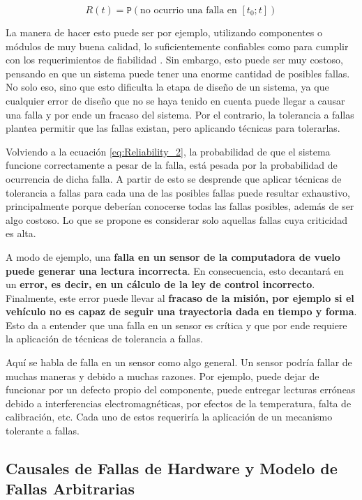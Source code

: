 \begin{equation}
    R(t) = \mathtt{P}\left( \text{no ocurrio una falla en $[t_0;t]$} \right)
    \label{eq:Reliability_3}
\end{equation}

La manera de hacer esto puede ser por ejemplo, utilizando componentes o módulos de muy buena calidad, lo suficientemente confiables como para cumplir con los requerimientos de fiabilidad \cite{nelson1990fault}. Sin embargo, esto puede ser muy costoso, pensando en que un sistema puede tener una enorme cantidad de posibles fallas. No solo eso, sino que esto dificulta la etapa de diseño de un sistema, ya que cualquier error de diseño que no se haya tenido en cuenta puede llegar a causar una falla y por ende un fracaso del sistema. Por el contrario, la tolerancia a fallas plantea permitir que las fallas existan, pero aplicando técnicas para tolerarlas.

Volviendo a la ecuación \eqref{eq:Reliability_2}, la probabilidad de que el sistema funcione correctamente a pesar de la falla, está pesada por la probabilidad de ocurrencia de dicha falla. A partir de esto se desprende que aplicar técnicas de tolerancia a fallas para cada una de las posibles fallas puede resultar exhaustivo, principalmente porque deberían conocerse todas las fallas posibles, además de ser algo costoso. Lo que se propone es considerar solo aquellas fallas cuya criticidad es alta.

A modo de ejemplo, una \textbf{falla en un sensor de la computadora de vuelo puede generar una lectura incorrecta}. En consecuencia, esto decantará en un \textbf{error, es decir, en un cálculo de la ley de control incorrecto}. Finalmente, este error puede llevar al \textbf{fracaso de la misión, por ejemplo si el vehículo no es capaz de seguir una trayectoria dada en tiempo y forma}. Esto da a entender que una falla en un sensor es crítica y que por ende requiere la aplicación de técnicas de tolerancia a fallas.

Aquí se habla de falla en un sensor como algo general. Un sensor podría fallar de muchas maneras y debido a muchas razones. Por ejemplo, puede dejar de funcionar por un defecto propio del componente, puede entregar lecturas erróneas debido a interferencias electromagnéticas, por efectos de la temperatura, falta de calibración, etc. Cada uno de estos requeriría la aplicación de un mecanismo tolerante a fallas.

\subsection*{Causales de Fallas de Hardware y Modelo de Fallas Arbitrarias}

